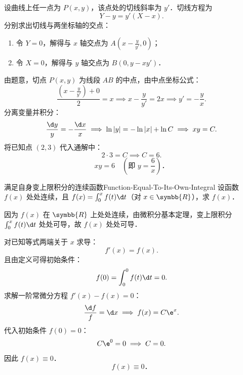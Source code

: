 \begin{solution}
    设曲线上任一点为 $P(x, y)$，该点处的切线斜率为 $y'$．切线方程为
    \begin{equation}
        Y - y = y'(X - x).
    \end{equation}
    分别求出切线与两坐标轴的交点：
    \begin{enumerate}
        \item 令 $Y = 0$，解得与 $x$ 轴交点为 $A\left(x - \frac{y}{y'}, 0\right)$；
        \item 令 $X = 0$，解得与 $y$ 轴交点为 $B(0, y - x y')$．
    \end{enumerate}
    由题意，切点 $P(x, y)$ 为线段 $AB$ 的中点，由中点坐标公式：
    \begin{equation}
        \frac{\left(x - \frac{y}{y'}\right) + 0}{2} = x \implies x - \frac{y}{y'} = 2x \implies y' = -\frac{y}{x}.
    \end{equation}
    分离变量并积分：
    \begin{equation}
        \frac{\d y}{y} = -\frac{\d x}{x} \implies \ln|y| = -\ln|x| + \ln C \implies xy = C.
    \end{equation}
    将已知点 $(2, 3)$ 代入通解中：
    \begin{equation}
        2 \cdot 3 = C \implies C = 6.
    \end{equation}
    \begin{equation}
        \boxed{xy = 6 \quad \left(\text{即 } y = \frac{6}{x}\right)．}
    \end{equation}
\end{solution}

\begin{problem}{满足自身变上限积分的连续函数}{Function-Equal-To-Its-Own-Integral}
    设函数 $f(x)$ 处处连续，且 $f(x) = \int_0^x f(t) \d t$（对 $x \in \symbb{R}$），求 $f(x)$．
\end{problem}

\begin{solution}
    因为 $f(x)$ 在 $\symbb{R}$ 上处处连续，由微积分基本定理，变上限积分 $\int_0^x f(t)\d t$ 处处可导，故 $f(x)$ 处处可导．

    对已知等式两端关于 $x$ 求导：
    \begin{equation}
        f'(x) = f(x).
    \end{equation}
    且由定义可得初始条件：
    \begin{equation}
        f(0) = \int_0^0 f(t) \d t = 0.
    \end{equation}
    求解一阶常微分方程 $f'(x) - f(x) = 0$：
    \begin{equation}
        \frac{\d f}{f} = \d x \implies f(x) = C \e^x.
    \end{equation}
    代入初始条件 $f(0) = 0$：
    \begin{equation}
        C \e^0 = 0 \implies C = 0.
    \end{equation}
    因此 $f(x) \equiv 0$．
    \begin{equation}
        \boxed{f(x) \equiv 0．}
    \end{equation}
\end{solution}


